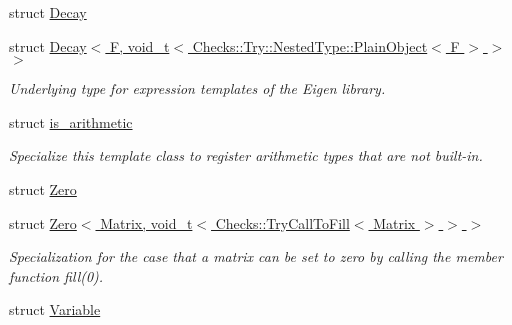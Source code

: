 \begin{DoxyCompactItemize}
struct \hyperlink{structFunG_1_1Decay}{\-Decay}
\item 
struct \hyperlink{structFunG_1_1Decay_3_01F_00_01void__t_3_01Checks_1_1Try_1_1NestedType_1_1PlainObject_3_01F_01_4_01_4_01_4}{\-Decay$<$ F, void\-\_\-t$<$ Checks\-::\-Try\-::\-Nested\-Type\-::\-Plain\-Object$<$ F $>$ $>$ $>$}
\begin{DoxyCompactList}\small\item\em \-Underlying type for expression templates of the \-Eigen library. \end{DoxyCompactList}\item 
struct \hyperlink{structFunG_1_1is__arithmetic}{is\-\_\-arithmetic}
\begin{DoxyCompactList}\small\item\em \-Specialize this template class to register arithmetic types that are not built-\/in. \end{DoxyCompactList}\item 
struct \hyperlink{structFunG_1_1Zero}{\-Zero}
\item 
struct \hyperlink{structFunG_1_1Zero_3_01Matrix_00_01void__t_3_01Checks_1_1TryCallToFill_3_01Matrix_01_4_01_4_01_4}{\-Zero$<$ Matrix, void\-\_\-t$<$ Checks\-::\-Try\-Call\-To\-Fill$<$ Matrix $>$ $>$ $>$}
\begin{DoxyCompactList}\small\item\em \-Specialization for the case that a matrix can be set to zero by calling the member function fill(0). \end{DoxyCompactList}\item 
struct \hyperlink{structFunG_1_1Variable}{\-Variable}
\end{DoxyCompactItemize}
